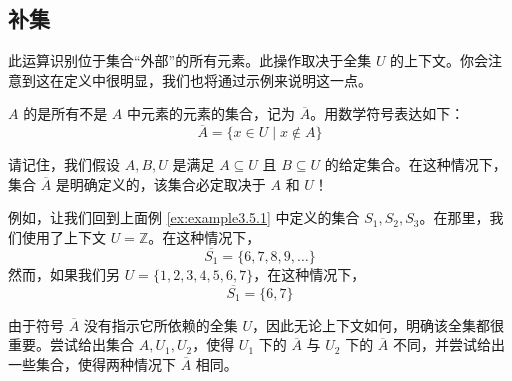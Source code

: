 \subsection{补集}

此运算识别位于集合``外部''的所有元素。此操作取决于全集 $U$ 的上下文。你会注意到这在定义中很明显，我们也将通过示例来说明这一点。

\begin{definition}
    $A$ 的是所有不是 $A$ 中元素的元素的集合，记为 $\overline{A}$。用数学符号表达如下：
    \[\overline{A} = \{x \in U \mid x \notin A\}\]
\end{definition}

请记住，我们假设 $A,B,U$ 是满足 $A \subseteq U$ 且 $B \subseteq U$ 的给定集合。在这种情况下，集合 $\overline{A}$ 是明确定义的，该集合必定取决于 $A$ 和 $U$！\\

\begin{example}
    例如，让我们回到上面例 \ref{ex:example3.5.1} 中定义的集合 $S_1, S_2, S_3$。在那里，我们使用了上下文 $U = \mathbb{Z}$。在这种情况下，
    \[\overline{S_1} = \{6, 7, 8, 9, \dots \}\]
    然而，如果我们另 $U = \{1, 2, 3, 4, 5, 6, 7\}$，在这种情况下，
    \[\overline{S_1} = \{6, 7\}\]
\end{example}

由于符号 $\overline{A}$ 没有指示它所依赖的全集 $U$，因此无论上下文如何，明确该全集都很重要。尝试给出集合 $A, U_1, U_2$，使得 $U_1$ 下的 $\overline{A}$ 与 $U_2$ 下的 $\overline{A}$ 不同，并尝试给出一些集合，使得两种情况下 $\overline{A}$ 相同。
